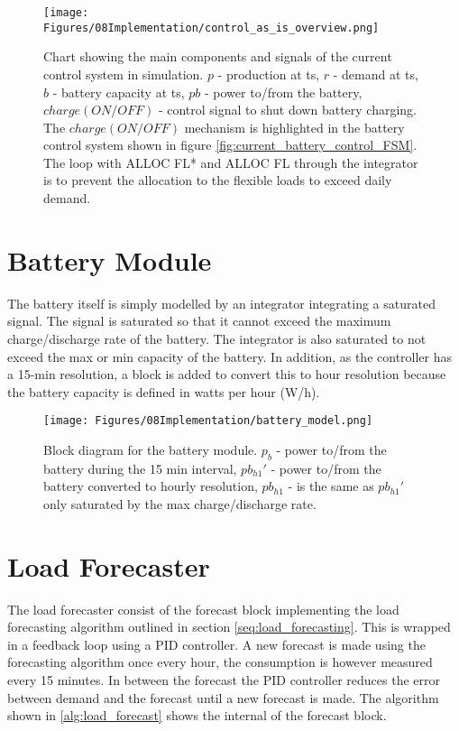 \begin{figure}
    \centering
    \texttt{[image: Figures/08Implementation/control\_as\_is\_overview.png]}
    \caption[Current control system block chart]{Chart showing the main components and signals of the current control system in simulation. $p$ - production at ts, $r$ - demand at ts, $b$ - battery capacity at ts, $pb$ - power to/from the battery, $charge(ON/OFF)$ - control signal to shut down battery charging. The $charge(ON/OFF)$ mechanism is highlighted in the battery control system shown in figure \ref{fig:current_battery_control_FSM}. The loop with ALLOC FL* and ALLOC FL through the integrator is to prevent the allocation to the flexible loads to exceed daily demand.}
    \label{fig:control_as_is_overview}
\end{figure}


\section{Battery Module}
The battery itself is simply modelled by an integrator integrating a saturated signal. The signal is saturated so that it cannot exceed the maximum charge/discharge rate of the battery. The integrator is also saturated to not exceed the max or min capacity of the battery. In addition, as the controller has a 15-min resolution, a block is added to convert this to hour resolution because the battery capacity is defined in watts per hour (W/h).

\begin{figure}
    \centering
    \texttt{[image: Figures/08Implementation/battery\_model.png]}
    \caption[Battery module block diagram]{Block diagram for the battery module. $p_b$ - power to/from the battery during the 15 min interval, $pb_{h1}'$ - power to/from the battery converted to hourly resolution, $pb_{h1}$ - is the same as $pb_{h1}'$ only saturated by the max charge/discharge rate.}
    \label{fig:battery_block}
\end{figure}

\section{Load Forecaster}

The load forecaster consist of the forecast block implementing the load forecasting algorithm outlined in section \ref{seq:load_forecasting}. This is wrapped in a feedback loop using a PID controller. A new forecast is made using the forecasting algorithm once every hour, the consumption is however measured every 15 minutes. In between the forecast the PID controller reduces the error between demand and the forecast until a new forecast is made. The algorithm shown in \ref{alg:load_forecast} shows the internal of the forecast block.

